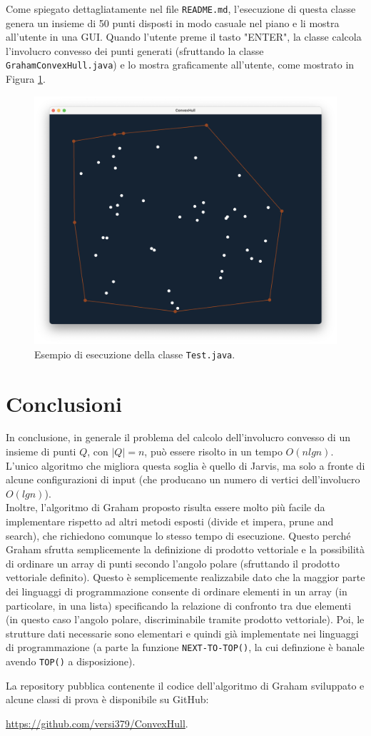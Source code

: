 \documentclass[12pt,a4paper]{report}
\begin{document}
Come spiegato dettagliatamente nel file \texttt{README.md}, l'esecuzione di questa classe genera un insieme di 50 punti disposti in modo casuale nel piano e li mostra all'utente in una GUI. Quando l'utente preme il tasto "ENTER", la classe calcola l'involucro convesso dei punti generati (sfruttando la classe \texttt{GrahamConvexHull.java}) e lo mostra graficamente all'utente, come mostrato in Figura \ref{fig:GUIClass}.

\begin{figure}[ht]
    \centering
    \includegraphics[width=0.75\linewidth]{GUIClass.png}
    \caption{Esempio di esecuzione della classe \texttt{Test.java}.}
    \label{fig:GUIClass}
\end{figure}

\chapter{Conclusioni}\label{ch:conclusioni}
In conclusione, in generale il problema del calcolo dell'involucro convesso di un insieme di punti $Q$, con $|Q| = n$, può essere risolto in un tempo $O(nlgn)$. L'unico algoritmo che migliora questa soglia è quello di Jarvis, ma solo a fronte di alcune configurazioni di input (che producano un numero di vertici dell'involucro $O(lgn)$).\\

Inoltre, l'algoritmo di Graham proposto risulta essere molto più facile da implementare rispetto ad altri metodi esposti (divide et impera, prune and search), che richiedono comunque lo stesso tempo di esecuzione. Questo perché Graham sfrutta semplicemente la definizione di prodotto vettoriale e la possibilità di ordinare un array di punti secondo l'angolo polare (sfruttando il prodotto vettoriale definito). Questo è semplicemente realizzabile dato che la maggior parte dei linguaggi di programmazione consente di ordinare elementi in un array (in particolare, in una lista) specificando la relazione di confronto tra due elementi (in questo caso l'angolo polare, discriminabile tramite prodotto vettoriale). Poi, le strutture dati necessarie sono elementari e quindi già implementate nei linguaggi di programmazione (a parte la funzione \texttt{NEXT-TO-TOP()}, la cui definzione è banale avendo \texttt{TOP()} a disposizione).

\pagebreak

\nocite{*}



\vspace{10mm}

La repository pubblica contenente il codice dell'algoritmo di Graham sviluppato e alcune classi di prova è disponibile su GitHub:

\url{https://github.com/versi379/ConvexHull}.
\end{document}
